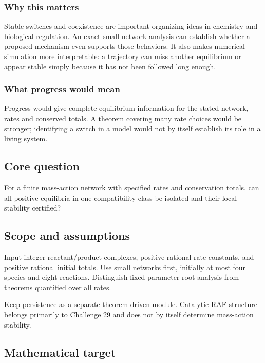 \documentclass[
  11pt,
]{article}
\begin{document}
\subsubsection{Why this matters}

Stable switches and coexistence are important organizing ideas in
chemistry and biological regulation. An exact small-network analysis can
establish whether a proposed mechanism even supports those behaviors. It
also makes numerical simulation more interpretable: a trajectory can
miss another equilibrium or appear stable simply because it has not been
followed long enough.

\subsubsection{What progress would mean}

Progress would give complete equilibrium information for the stated
network, rates and conserved totals. A theorem covering many rate
choices would be stronger; identifying a switch in a model would not by
itself establish its role in a living system.

\subsection{Core question}

For a finite mass-action network with specified rates and conservation
totals, can all positive equilibria in one compatibility class be
isolated and their local stability certified?

\subsection{Scope and assumptions}

Input integer reactant/product complexes, positive rational rate
constants, and positive rational initial totals. Use small networks
first, initially at most four species and eight reactions. Distinguish
fixed-parameter root analysis from theorems quantified over all rates.

Keep persistence as a separate theorem-driven module. Catalytic RAF
structure belongs primarily to Challenge 29 and does not by itself
determine mass-action stability.

\subsection{Mathematical target}
\end{document}
